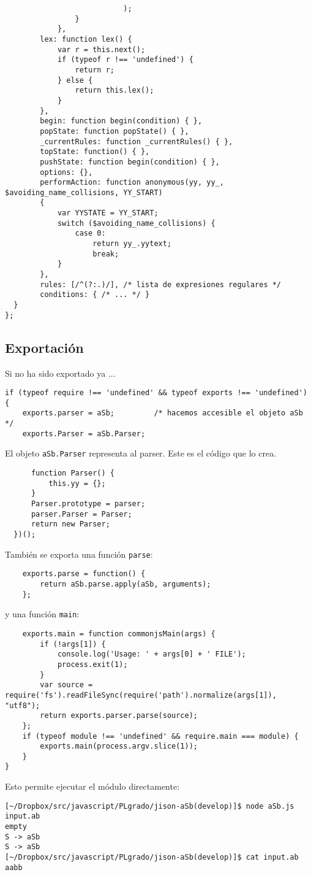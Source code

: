 \begin{verbatim}
                           );
                }
            },
        lex: function lex() {
            var r = this.next();
            if (typeof r !== 'undefined') {
                return r;
            } else {
                return this.lex();
            }
        },
        begin: function begin(condition) { },
        popState: function popState() { },
        _currentRules: function _currentRules() { },
        topState: function() { },
        pushState: function begin(condition) { },
        options: {},
        performAction: function anonymous(yy, yy_, $avoiding_name_collisions, YY_START)
        {
            var YYSTATE = YY_START;
            switch ($avoiding_name_collisions) {
                case 0:
                    return yy_.yytext;
                    break;
            }
        },
        rules: [/^(?:.)/], /* lista de expresiones regulares */
        conditions: { /* ... */ }
  }
};
\end{verbatim}

\subsection{Exportación}

Si no ha sido exportado ya ...
\begin{verbatim}
if (typeof require !== 'undefined' && typeof exports !== 'undefined') {
    exports.parser = aSb;         /* hacemos accesible el objeto aSb  */
    exports.Parser = aSb.Parser;
\end{verbatim}
El objeto \verb|aSb.Parser| representa al parser. Este es el código que lo crea.
\begin{verbatim}
      function Parser() {
          this.yy = {}; 
      }   
      Parser.prototype = parser;
      parser.Parser = Parser;
      return new Parser;
  })();
\end{verbatim}
También se exporta una función \verb|parse|:
\begin{verbatim}
    exports.parse = function() {
        return aSb.parse.apply(aSb, arguments);
    };
\end{verbatim}
y una función \verb|main|:
\begin{verbatim}
    exports.main = function commonjsMain(args) {
        if (!args[1]) {
            console.log('Usage: ' + args[0] + ' FILE');
            process.exit(1);
        }
        var source = require('fs').readFileSync(require('path').normalize(args[1]), "utf8");
        return exports.parser.parse(source);
    };
    if (typeof module !== 'undefined' && require.main === module) {
        exports.main(process.argv.slice(1));
    }
}
\end{verbatim}
Esto permite ejecutar el módulo directamente:
\begin{verbatim}
[~/Dropbox/src/javascript/PLgrado/jison-aSb(develop)]$ node aSb.js input.ab 
empty
S -> aSb
S -> aSb
[~/Dropbox/src/javascript/PLgrado/jison-aSb(develop)]$ cat input.ab 
aabb
\end{verbatim}

